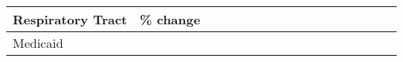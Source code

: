 \documentclass[
]{book}
\begin{document}
\begin{longtable}[]{@{}lllllllllllllllll@{}}
\begin{minipage}[b]{0.04\columnwidth}
Respiratory Tract\strut
\end{minipage} & \begin{minipage}[b]{0.03\columnwidth}\raggedright
\% change\strut
\end{minipage}\tabularnewline
\midrule
\endhead
\begin{minipage}[t]{0.03\columnwidth}\raggedright
Medicaid\strut
\end{minipage} & \begin{minipage}[t]{0.04\columnwidth}\raggedright
\strut
\end{minipage} & \begin{minipage}[t]{0.03\columnwidth}\raggedright
\strut
\end{minipage} & \begin{minipage}[t]{0.04\columnwidth}\raggedright
\strut
\end{minipage} & \begin{minipage}[t]{0.03\columnwidth}\raggedright
\strut
\end{minipage} & \begin{minipage}[t]{0.05\columnwidth}\raggedright
\strut
\end{minipage} & \begin{minipage}[t]{0.03\columnwidth}\raggedright
\strut
\end{minipage} & \begin{minipage}[t]{0.03\columnwidth}\raggedright
\strut
\end{minipage} & \begin{minipage}[t]{0.03\columnwidth}\raggedright
\strut
\end{minipage} & \begin{minipage}[t]{0.05\columnwidth}\raggedright
\strut
\end{minipage} & \begin{minipage}[t]{0.03\columnwidth}\raggedright
\strut
\end{minipage} & \begin{minipage}[t]{0.03\columnwidth}\raggedright
\strut
\end{minipage} & \begin{minipage}[t]{0.03\columnwidth}\raggedright
\strut
\end{minipage} & \begin{minipage}[t]{0.04\columnwidth}\raggedright
\strut
\end{minipage} & \begin{minipage}[t]{0.03\columnwidth}\raggedright
\strut
\end{minipage} & \begin{minipage}[t]{0.04\columnwidth}\raggedright

\end{minipage}
\end{longtable}
\end{document}

